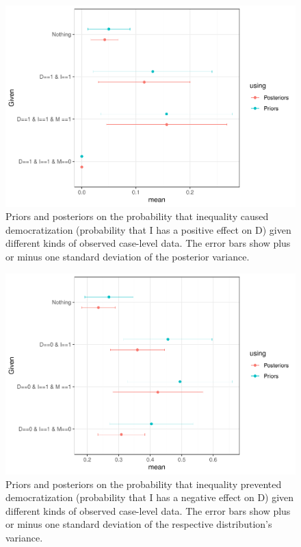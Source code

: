 \documentclass[
  12pt,
]{book}
\begin{document}
\begin{figure}

{\centering \includegraphics{ii_files/figure-latex/dcaused-1} 

}

\caption{Priors and posteriors on the probability that inequality caused democratization (probability that I has a positive effect on D) given different kinds of observed case-level data. The error bars show plus or minus one standard deviation of the posterior variance. }\label{fig:dcaused}
\end{figure}

\begin{figure}

{\centering \includegraphics{ii_files/figure-latex/dprevented-1} 

}

\caption{Priors and posteriors on the probability that inequality prevented democratization (probability that I has a negative effect on D) given different kinds of observed case-level data. The error bars show plus or minus one standard deviation of the respective distribution's variance.}\label{fig:dprevented}
\end{figure}
\end{document}
